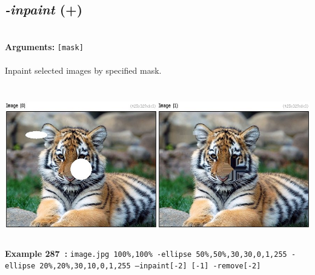 \documentclass[a4paper,11pt,twoside]{book}
\begin{document}
\subsection{\emph{-inpaint} (+)}\vspace*{-0.5em}
~\\\textbf{Arguments: } 
{\small \texttt{[mask]}}\\~\\
Inpaint selected images by specified mask.
\begin{center}\includegraphics[keepaspectratio=true,height=7cm,width=\textwidth]{img/gmic_def287.jpg}\\
{\footnotesize \textbf{Example 287~:} \texttt{image.jpg 100\%,100\% -ellipse 50\%,50\%,30,30,0,1,255 -ellipse 20\%,20\%,30,10,0,1,255 --inpaint[-2] [-1] -remove[-2]}}
\end{center}
\end{document}
